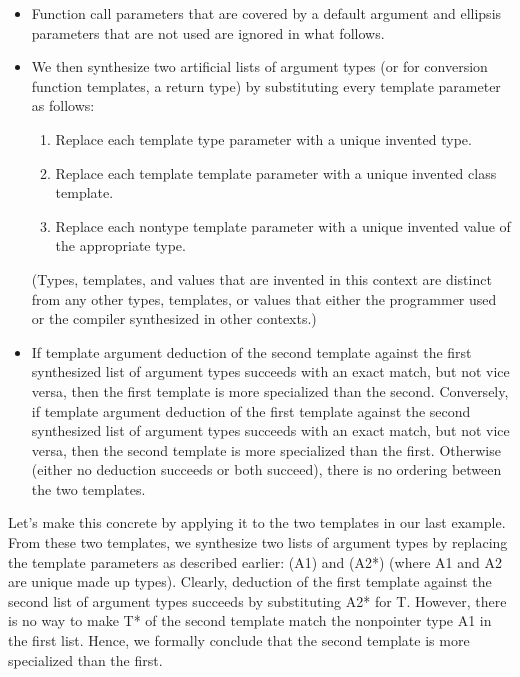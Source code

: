 \begin{itemize}
\item 
Function call parameters that are covered by a default argument and ellipsis parameters that are not used are ignored in what follows.

\item 
We then synthesize two artificial lists of argument types (or for conversion function templates, a return type) by substituting every template parameter as follows:

\begin{enumerate}
\item 
Replace each template type parameter with a unique invented type.

\item 
Replace each template template parameter with a unique invented class template.

\item 
Replace each nontype template parameter with a unique invented value of the appropriate type.
\end{enumerate}

(Types, templates, and values that are invented in this context are distinct from any other types, templates, or values that either the programmer used or the compiler synthesized in other contexts.)

\item 
If template argument deduction of the second template against the first synthesized list of argument types succeeds with an exact match, but not vice versa, then the first template is more specialized than the second. Conversely, if template argument deduction of the first template against the second synthesized list of argument types succeeds with an exact match, but not vice versa, then the second template is more specialized than the first. Otherwise (either no deduction succeeds or both succeed), there is no ordering between the two templates.
\end{itemize}

Let’s make this concrete by applying it to the two templates in our last example. From these two templates, we synthesize two lists of argument types by replacing the template parameters as described earlier: (A1) and (A2*) (where A1 and A2 are unique made up types). Clearly, deduction of the first template against the second list of argument types succeeds by substituting A2* for T. However, there is no way to make T* of the second template match the nonpointer type A1 in the first list. Hence, we formally conclude that the second template is more specialized than the first.

